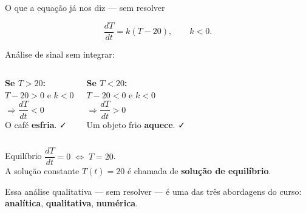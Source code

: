 \documentclass[12pt]{beamer}
\begin{document}

\begin{frame}{O que a equação já nos diz — sem resolver}

  \[
    \frac{dT}{dt} = k(T - 20), \qquad k < 0.
  \]

  \vspace{6pt}
  Análise de sinal sem integrar:

  \vspace{8pt}
  \begin{columns}[T]

      \textbf{Se $T > 20$:}\\
      $T - 20 > 0$ e $k < 0$\\
      $\Rightarrow \dfrac{dT}{dt} < 0$\\[6pt]
      O café \textbf{esfria}. ✓

      \textbf{Se $T < 20$:}\\
      $T - 20 < 0$ e $k < 0$\\
      $\Rightarrow \dfrac{dT}{dt} > 0$\\[6pt]
      Um objeto frio \textbf{aquece}. ✓

  \end{columns}

  \vspace{10pt}
  \pause

  \begin{exampleblock}{Equilíbrio}
    $\dfrac{dT}{dt} = 0 \;\Leftrightarrow\; T = 20$. \\[4pt]
    A solução constante $T(t) = 20$ é chamada de
    \textbf{solução de equilíbrio}.
  \end{exampleblock}

  \vspace{4pt}
  \pause
  \small
  Essa análise qualitativa — sem resolver — é uma das três abordagens
  do curso: \textbf{analítica}, \textbf{qualitativa}, \textbf{numérica}.

\end{frame}

\end{document}
